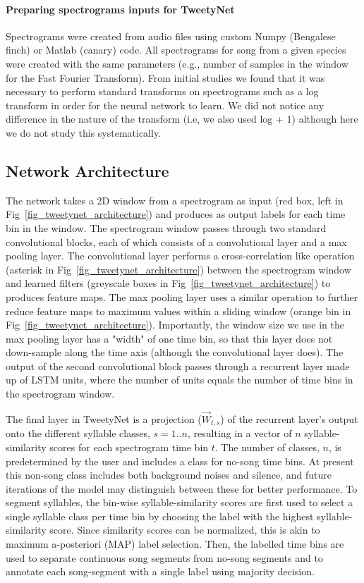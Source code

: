 \documentclass[10pt,letterpaper]{article}
\begin{document}
\paragraph{Preparing spectrograms inputs for TweetyNet}
Spectrograms were created from audio files using custom Numpy (Bengalese finch) or Matlab (canary) code.
All spectrograms for song from a given species were created with the same parameters (e.g., number of 
samples in the window for the Fast Fourier Transform). From initial studies we found that it was necessary 
to perform standard transforms on spectrograms such as a log transform in order for the neural network to 
learn. We did not notice any difference in the nature of the transform (i.e, we also used log + 1) 
although here we do not study this systematically.

\subsection*{Network Architecture}
The network takes a 2D window from a spectrogram as input (red box, left in Fig~\ref{fig_tweetynet_architecture}) and produces as output 
labels for each time bin in the window. 
The spectrogram window passes through two standard convolutional blocks, 
each of which consists of a convolutional layer and a max pooling layer. 
The convolutional layer performs a cross-correlation
like operation (asterisk in Fig~\ref{fig_tweetynet_architecture}) between the spectrogram window and learned filters (greyscale boxes in Fig~\ref{fig_tweetynet_architecture}) to produces feature maps.
The max pooling layer uses a similar operation to further reduce feature maps to maximum values within a sliding 
window (orange bin in Fig~\ref{fig_tweetynet_architecture}). Importantly, the window size we use in the max pooling layer has a "width" of one time bin, so that this 
layer does not down-sample along the time axis (although the convolutional layer does).
The output of the second convolutional block passes through a recurrent layer made up of LSTM units, where 
the number of units equals the number of time bins in the spectrogram window.

The final layer in TweetyNet is a projection ($\overrightarrow{W}_{t,s}$) of the recurrent layer's output onto the different syllable classes, $s=1..n$, resulting in a vector of $n$ syllable-similarity scores for each spectrogram time bin $t$. The number of classes, $n$, is predetermined by the user and includes a class for no-song time bins. At present this non-song class includes both background noises and silence, and future iterations of the model may distinguish between these for better performance. To segment syllables, the bin-wise syllable-similarity scores are first used to select a single syllable class per time bin by choosing the label with the highest syllable-similarity score. Since similarity scores can be normalized, this is akin to maximum a-posteriori (MAP) label selection. Then, the labelled time bins are used to separate continuous song segments from no-song segments and to annotate each song-segment with a single label using majority decision.  
\end{document}
